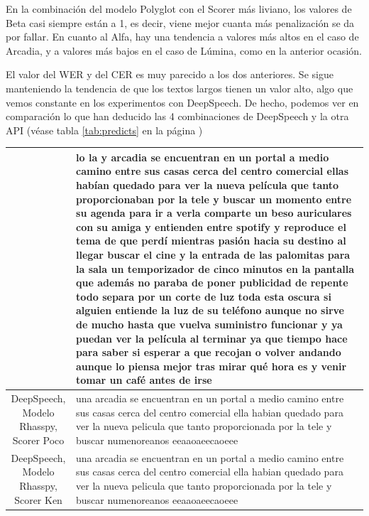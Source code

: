En la combinación del modelo Polyglot con el Scorer más liviano, los valores de Beta casi siempre están a 1, es decir, viene mejor cuanta más penalización se da por fallar. En cuanto al Alfa, hay una tendencia a valores más altos en el caso de Arcadia, y a valores más bajos en el caso de Lúmina, como en la anterior ocasión.

El valor del WER y del CER es muy parecido a los dos anteriores. Se sigue manteniendo la tendencia de que los textos largos tienen un valor alto, algo que vemos constante en los experimentos con DeepSpeech. De hecho, podemos ver en comparación lo que han deducido las 4 combinaciones de DeepSpeech y la otra API (véase tabla \ref{tab:predicts} en la página \pageref{tab:predicts})

\begin{table}
	\begin{tabularx}{\textwidth}{|c|X|}
		\hline
		\makecell{Vosk} & lo la y arcadia se encuentran en un portal a medio camino entre sus casas cerca del centro comercial ellas habían quedado para ver la nueva película que tanto proporcionaban por la tele y buscar un momento entre su agenda para ir a verla comparte un beso auriculares con su amiga y entienden entre spotify y reproduce el tema de que perdí mientras pasión hacia su destino al llegar buscar el cine y la entrada de las palomitas para la sala un temporizador de cinco minutos en la pantalla que además no paraba de poner publicidad de repente todo separa por un corte de luz toda esta oscura si alguien entiende la luz de su teléfono aunque no sirve de mucho hasta que vuelva suministro funcionar y ya puedan ver la película al terminar ya que tiempo hace para saber si esperar a que recojan o volver andando aunque lo piensa mejor tras mirar qué hora es y venir tomar un café antes de irse \\ \hline
		\makecell{DeepSpeech,\\ Modelo Rhasspy,\\ Scorer Poco} & una arcadia se encuentran en un portal a medio camino entre sus casas cerca del centro comercial ella habian quedado para ver la nueva pelicula que tanto proporcionada por la tele y buscar numenoreanos eeaaoaeecaoeee \\ \hline
		\makecell{DeepSpeech,\\ Modelo Rhasspy,\\ Scorer Ken} & una arcadia se encuentran en un portal a medio camino entre sus casas cerca del centro comercial ella habian quedado para ver la nueva pelicula que tanto proporcionada por la tele y buscar numenoreanos eeaaoaeecaoeee \\ \hline

\end{tabularx}
\end{table}
